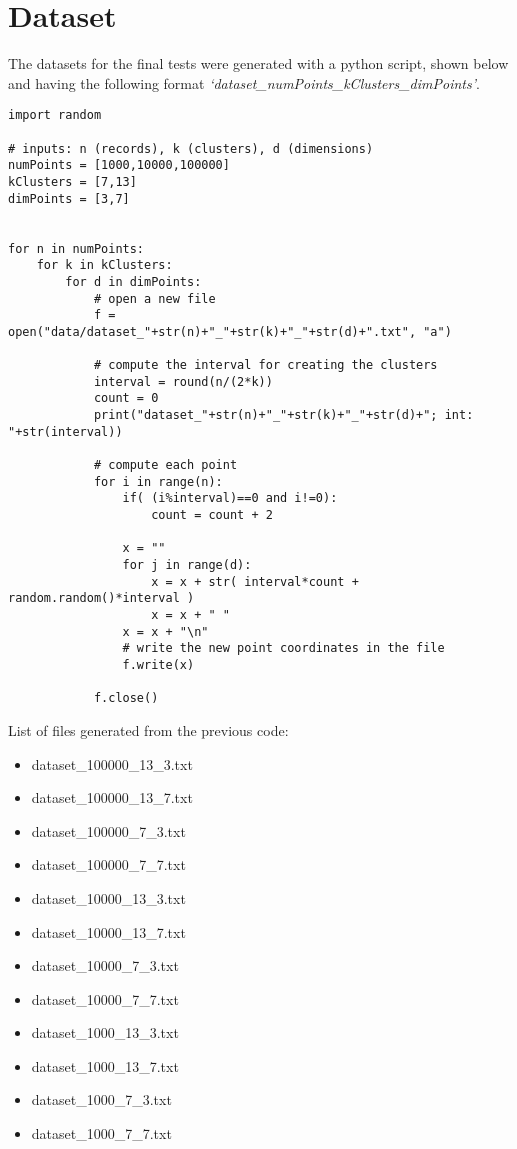 \documentclass[a4paper, oneside]{article}
\begin{document}
\section{Dataset}
The datasets for the final tests were generated with a python script, shown below and having the following format \textit{`dataset\_numPoints\_kClusters\_dimPoints'}.\\

\begin{verbatim}
import random

# inputs: n (records), k (clusters), d (dimensions)
numPoints = [1000,10000,100000]
kClusters = [7,13]
dimPoints = [3,7]


for n in numPoints:
    for k in kClusters:
        for d in dimPoints:
            # open a new file
            f = open("data/dataset_"+str(n)+"_"+str(k)+"_"+str(d)+".txt", "a")
            
            # compute the interval for creating the clusters
            interval = round(n/(2*k))
            count = 0
            print("dataset_"+str(n)+"_"+str(k)+"_"+str(d)+"; int: "+str(interval))
            
            # compute each point
            for i in range(n):
                if( (i%interval)==0 and i!=0):
                    count = count + 2
                
                x = ""
                for j in range(d):
                    x = x + str( interval*count + random.random()*interval )
                    x = x + " "
                x = x + "\n"
                # write the new point coordinates in the file
                f.write(x)
            
            f.close()
\end{verbatim}

\vspace{4mm}
List of files generated from the previous code:
\begin{itemize}
\item dataset\_100000\_13\_3.txt
\item dataset\_100000\_13\_7.txt
\item dataset\_100000\_7\_3.txt
\item dataset\_100000\_7\_7.txt
\item dataset\_10000\_13\_3.txt
\item dataset\_10000\_13\_7.txt
\item dataset\_10000\_7\_3.txt
\item dataset\_10000\_7\_7.txt
\item dataset\_1000\_13\_3.txt
\item dataset\_1000\_13\_7.txt
\item dataset\_1000\_7\_3.txt
\item dataset\_1000\_7\_7.txt 
\end{itemize}
\end{document}
